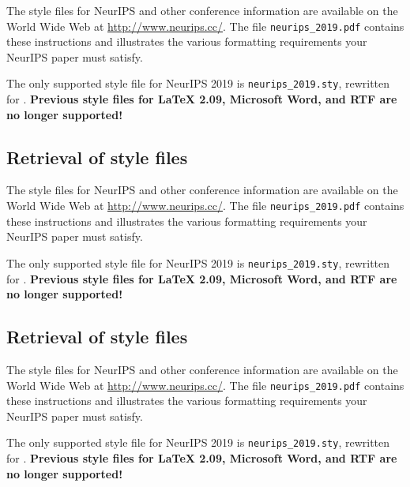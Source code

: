 \documentclass{article}
\begin{document}
The style files for NeurIPS and other conference information are available on the World Wide Web at  \url{http://www.neurips.cc/}. The file \verb+neurips_2019.pdf+ contains these instructions and illustrates the various formatting requirements your NeurIPS paper must satisfy.

The only supported style file for NeurIPS 2019 is \verb+neurips_2019.sty+, rewritten for \LaTeXe{}. \textbf{Previous style files for \LaTeX{} 2.09,  Microsoft Word, and RTF are no longer supported!}


\subsection{Retrieval of style files}

The style files for NeurIPS and other conference information are available on the World Wide Web at  \url{http://www.neurips.cc/}. The file \verb+neurips_2019.pdf+ contains these instructions and illustrates the various formatting requirements your NeurIPS paper must satisfy.

The only supported style file for NeurIPS 2019 is \verb+neurips_2019.sty+, rewritten for \LaTeXe{}. \textbf{Previous style files for \LaTeX{} 2.09,  Microsoft Word, and RTF are no longer supported!}


\subsection{Retrieval of style files}

The style files for NeurIPS and other conference information are available on the World Wide Web at  \url{http://www.neurips.cc/}. The file \verb+neurips_2019.pdf+ contains these instructions and illustrates the various formatting requirements your NeurIPS paper must satisfy.

The only supported style file for NeurIPS 2019 is \verb+neurips_2019.sty+, rewritten for \LaTeXe{}. \textbf{Previous style files for \LaTeX{} 2.09,  Microsoft Word, and RTF are no longer supported!}


\end{document}
